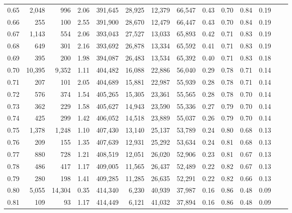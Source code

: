 \begin{tabular}{rrrrrrrrrrrrrr}
0.65 &   2,048 &     996 &      2.06 &  391,645 &   28,925 &  12,379 &  66,547 &  0.43 &  0.70 &  0.84 &      0.19 \\
0.66 &     255 &     100 &      2.55 &  391,900 &   28,670 &  12,479 &  66,447 &  0.43 &  0.70 &  0.84 &      0.19 \\
0.67 &   1,143 &     554 &      2.06 &  393,043 &   27,527 &  13,033 &  65,893 &  0.42 &  0.71 &  0.83 &      0.19 \\
0.68 &     649 &     301 &      2.16 &  393,692 &   26,878 &  13,334 &  65,592 &  0.41 &  0.71 &  0.83 &      0.19 \\
0.69 &     395 &     200 &      1.98 &  394,087 &   26,483 &  13,534 &  65,392 &  0.40 &  0.71 &  0.83 &      0.18 \\
0.70 &  10,395 &   9,352 &      1.11 &  404,482 &   16,088 &  22,886 &  56,040 &  0.29 &  0.78 &  0.71 &      0.14 \\
0.71 &     207 &     101 &      2.05 &  404,689 &   15,881 &  22,987 &  55,939 &  0.28 &  0.78 &  0.71 &      0.14 \\
0.72 &     576 &     374 &      1.54 &  405,265 &   15,305 &  23,361 &  55,565 &  0.28 &  0.78 &  0.70 &      0.14 \\
0.73 &     362 &     229 &      1.58 &  405,627 &   14,943 &  23,590 &  55,336 &  0.27 &  0.79 &  0.70 &      0.14 \\
0.74 &     425 &     299 &      1.42 &  406,052 &   14,518 &  23,889 &  55,037 &  0.26 &  0.79 &  0.70 &      0.14 \\
0.75 &   1,378 &   1,248 &      1.10 &  407,430 &   13,140 &  25,137 &  53,789 &  0.24 &  0.80 &  0.68 &      0.13 \\
0.76 &     209 &     155 &      1.35 &  407,639 &   12,931 &  25,292 &  53,634 &  0.24 &  0.81 &  0.68 &      0.13 \\
0.77 &     880 &     728 &      1.21 &  408,519 &   12,051 &  26,020 &  52,906 &  0.23 &  0.81 &  0.67 &      0.13 \\
0.78 &     486 &     417 &      1.17 &  409,005 &   11,565 &  26,437 &  52,489 &  0.22 &  0.82 &  0.67 &      0.13 \\
0.79 &     280 &     198 &      1.41 &  409,285 &   11,285 &  26,635 &  52,291 &  0.22 &  0.82 &  0.66 &      0.13 \\
0.80 &   5,055 &  14,304 &      0.35 &  414,340 &    6,230 &  40,939 &  37,987 &  0.16 &  0.86 &  0.48 &      0.09 \\
0.81 &     109 &      93 &      1.17 &  414,449 &    6,121 &  41,032 &  37,894 &  0.16 &  0.86 &  0.48 &      0.09 \\

\end{tabular}
